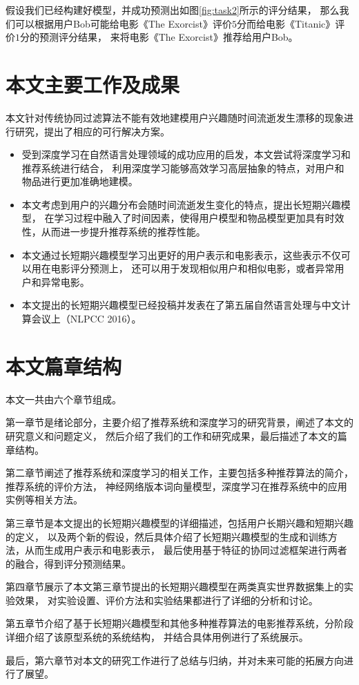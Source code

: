 假设我们已经构建好模型，并成功预测出如图\ref{fig:task2}所示的评分结果，
那么我们可以根据用户Bob可能给电影《The Exorcist》评价$5$分而给电影《Titanic》评价$1$分的预测评分结果，
来将电影《The Exorcist》推荐给用户Bob。

\section{本文主要工作及成果}
本文针对传统协同过滤算法不能有效地建模用户兴趣随时间流逝发生漂移的现象进行研究，提出了相应的可行解决方案。
\begin{itemize}
\item
受到深度学习在自然语言处理领域的成功应用的启发，本文尝试将深度学习和推荐系统进行结合，
利用深度学习能够高效学习高层抽象的特点，对用户和物品进行更加准确地建模。
\item
本文考虑到用户的兴趣分布会随时间流逝发生变化的特点，提出长短期兴趣模型，
在学习过程中融入了时间因素，使得用户模型和物品模型更加具有时效性，从而进一步提升推荐系统的推荐性能。
\item
本文通过长短期兴趣模型学习出更好的用户表示和电影表示，这些表示不仅可以用在电影评分预测上，
还可以用于发现相似用户和相似电影，或者异常用户和异常电影。
\item
本文提出的长短期兴趣模型已经投稿并发表在了第五届自然语言处理与中文计算会议上（NLPCC 2016）。
\end{itemize}

\section{本文篇章结构}
本文一共由六个章节组成。

第一章节是绪论部分，主要介绍了推荐系统和深度学习的研究背景，阐述了本文的研究意义和问题定义，
然后介绍了我们的工作和研究成果，最后描述了本文的篇章结构。

第二章节阐述了推荐系统和深度学习的相关工作，主要包括多种推荐算法的简介，推荐系统的评价方法，
神经网络版本词向量模型，深度学习在推荐系统中的应用实例等相关方法。

第三章节是本文提出的长短期兴趣模型的详细描述，包括用户长期兴趣和短期兴趣的定义，
以及两个新的假设，然后具体介绍了长短期兴趣模型的生成和训练方法，从而生成用户表示和电影表示，
最后使用基于特征的协同过滤框架进行两者的融合，得到评分预测结果。

第四章节展示了本文第三章节提出的长短期兴趣模型在两类真实世界数据集上的实验效果，
对实验设置、评价方法和实验结果都进行了详细的分析和讨论。

第五章节介绍了基于长短期兴趣模型和其他多种推荐算法的电影推荐系统，分阶段详细介绍了该原型系统的系统结构，
并结合具体用例进行了系统展示。

最后，第六章节对本文的研究工作进行了总结与归纳，并对未来可能的拓展方向进行了展望。


